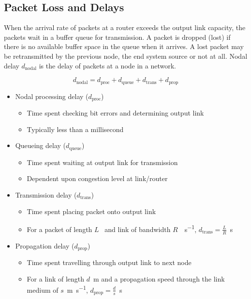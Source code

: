 \subsection{Packet Loss and Delays}

When the arrival rate of packets at a router exceeds the output link capacity, the packets wait in a buffer queue for transmission.
A packet is dropped (lost) if there is no available buffer space in the queue when it arrives.
A lost packet may be retransmitted by the previous node, the end system source or not at all.
Nodal delay \( d_{\text{nodal}} \) is the delay of packets at a node in a network.

\begin{equation*}
  d_{\text{nodal}} = d_{\text{proc}} + d_{\text{queue}} + d_{\text{trans}} + d_{\text{prop}}
\end{equation*}

\begin{itemize}
  \item Nodal processing delay (\( d_{\text{proc}} \))
  \begin{itemize}
    \item Time spent checking bit errors and determining output link
    \item Typically less than a millisecond
  \end{itemize}
  \item Queueing delay (\( d_{\text{queue}} \))
  \begin{itemize}
    \item Time spent waiting at output link for transmission
    \item Dependent upon congestion level at link/router
  \end{itemize}
  \item Transmission delay (\( d_{\text{trans}} \))
  \begin{itemize}
    \item Time spent placing packet onto output link
    \item For a packet of length \(L\)~\si{\bit} and link of bandwidth \(R\)~\si{\bit\per\second}, \( d_{\text{trans}} = \frac{L}{R} \)~\si{\second}
  \end{itemize}
  \item Propagation delay (\( d_{\text{prop}} \))
  \begin{itemize}
    \item Time spent travelling through output link to next node
    \item For a link of length \(d\)~\si{\metre} and a propagation speed through the link medium of \(s\)~\si{\metre\per\second}, \( d_{\text{prop}} = \frac{d}{s} \)~\si{\second}
  \end{itemize}
\end{itemize}

